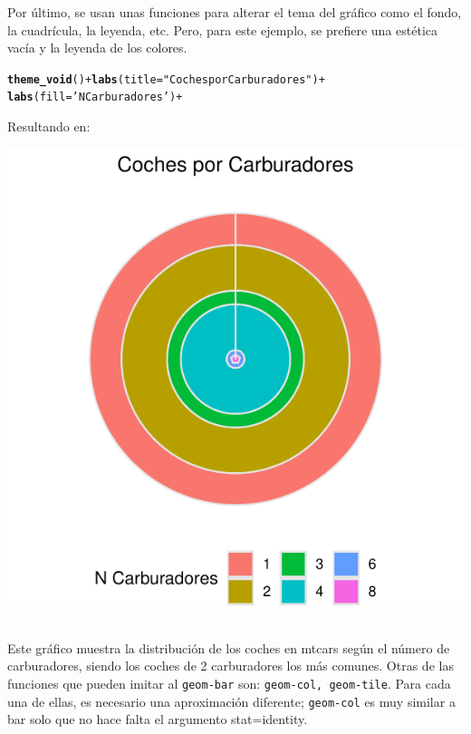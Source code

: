\documentclass{article}\usepackage[]{graphicx}\usepackage[]{color}
\makeatletter
\def\maxwidth{ %
  \ifdim\Gin@nat@width>\linewidth
    \linewidth
  \else
    \Gin@nat@width
  \fi
}
\newcommand{\hlstr}[1]{\textcolor[rgb]{0.192,0.494,0.8}{#1}}%
\newcommand{\hlkwd}[1]{\textcolor[rgb]{0.737,0.353,0.396}{\textbf{#1}}}%
\newenvironment{kframe}{%
 \def\at@end@of@kframe{}%
 \ifinner\ifhmode%
  \def\at@end@of@kframe{\end{minipage}}%
  \begin{minipage}{\columnwidth}%
 \fi\fi%
 \def\FrameCommand##1{\hskip\@totalleftmargin \hskip-\fboxsep
 \colorbox{shadecolor}{##1}\hskip-\fboxsep
     \hskip-\linewidth \hskip-\@totalleftmargin \hskip\columnwidth}%
 \MakeFramed {\advance\hsize-\width
   \@totalleftmargin\z@ \linewidth\hsize
   \@setminipage}}%
 {\par\unskip\endMakeFramed%
 \at@end@of@kframe}
\newenvironment{knitrout}{}{} %
\makeatother
\begin{document}
Por \'ultimo, se usan unas funciones para alterar el tema del gr\'afico como el fondo, la cuadr\'icula, la leyenda, etc. Pero, para este ejemplo, se prefiere una est\'etica vac\'ia y la leyenda de los colores.
\begin{knitrout}
\color{fgcolor}\begin{kframe}
\begin{alltt}
  \hlkwd{theme_void}() + \hlkwd{labs}(title = \hlstr{"Coches por Carburadores"}) +
  \hlkwd{labs}(fill=\hlstr{'N Carburadores'}) +
\end{alltt}
\end{kframe}
\end{knitrout}
Resultando en:
\begin{knitrout}
\color{fgcolor}

{\centering \includegraphics[width=\maxwidth]{figure/plot_ring_gg1-1} 

}



\end{knitrout}
~\\
Este gr\'afico muestra la distribuci\'on de los coches en mtcars seg\'un el n\'umero de carburadores, siendo los coches de 2 carburadores los m\'as comunes.
\clearpage
Otras de las funciones que pueden imitar al \texttt{geom-bar} son: \texttt{geom-col, geom-tile}. Para cada una de ellas, es necesario una aproximaci\'on diferente; \texttt{geom-col} es muy similar a bar solo que no hace falta el argumento stat=identity.
\end{document}
